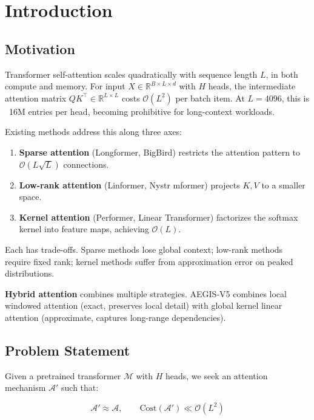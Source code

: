 \section{Introduction}

\subsection{Motivation}

Transformer self-attention scales quadratically with sequence length $L$, 
in both compute and memory. For input $X \in \mathbb{R}^{B \times L \times d}$ 
with $H$ heads, the intermediate attention matrix $Q K^\top \in \mathbb{R}^{L \times L}$ 
costs $\mathcal{O}(L^2)$ per batch item. At $L = 4096$, this is ~16M 
entries per head, becoming prohibitive for long-context workloads.

Existing methods address this along three axes:

\begin{enumerate}
\item \textbf{Sparse attention} (Longformer, BigBird) restricts the attention
  pattern to $\mathcal{O}(L \sqrt{L})$ connections.
\item \textbf{Low-rank attention} (Linformer, Nystr mformer) projects $K, V$ to a
  smaller space.
\item \textbf{Kernel attention} (Performer, Linear Transformer) factorizes the
  softmax kernel into feature maps, achieving $\mathcal{O}(L)$.

\end{enumerate}
Each has trade-offs. Sparse methods lose global context; low-rank methods 
require fixed rank; kernel methods suffer from approximation error on 
peaked distributions.

\textbf{Hybrid attention} combines multiple strategies. AEGIS-V5 combines local 
windowed attention (exact, preserves local detail) with global kernel 
linear attention (approximate, captures long-range dependencies).

\subsection{Problem Statement}

Given a pretrained transformer $\mathcal{M}$ with $H$ heads, we seek an 
attention mechanism $\mathcal{A}'$ such that:

\begin{equation}
\mathcal{A}' \approx \mathcal{A}, \qquad
\text{Cost}(\mathcal{A}') \ll \mathcal{O}(L^2)
\end{equation}

